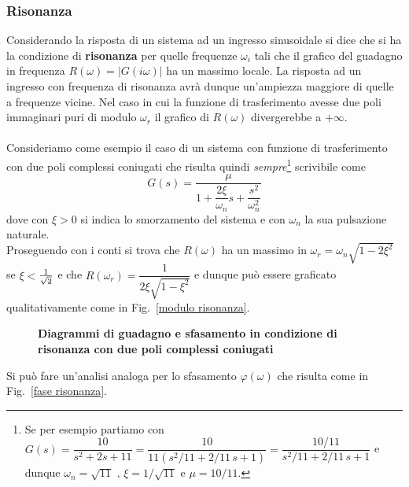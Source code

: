 \documentclass[a4paper]{article}
\begin{document}
	\subsubsection{Risonanza}
	Considerando la risposta di un sistema ad un ingresso sinusoidale si dice che si ha la condizione di \textbf{risonanza} per quelle frequenze $\omega_i$ tali che il grafico del guadagno in frequenza $R(\omega)=|G(i\omega)|$ ha un massimo locale. La risposta ad un ingresso con frequenza di risonanza avrà dunque un'ampiezza maggiore di quelle a frequenze vicine. Nel caso in cui la funzione di trasferimento avesse due poli immaginari puri di modulo $\omega_r$ il grafico di $R(\omega)$ divergerebbe a $+\infty$. 
	\\\\
	Consideriamo come esempio il caso di un sistema con funzione di trasferimento con due poli complessi coniugati che risulta quindi \emph{sempre}\footnote{Se per esempio partiamo con $G(s)=\dfrac{10}{s^2+2s+11}=\dfrac{10}{11(s^2/11+2/11\,s+1)}=\dfrac{10/11}{s^2/11+2/11\,s+1}$ e dunque $\omega_n=\sqrt{11}\,\,,\,\xi=1/\sqrt{11}$ e $\mu=10/11$.} scrivibile come 
	\[G(s)=\dfrac{\mu}{1+\dfrac{2\xi}{\omega_n}s+\dfrac{s^2}{\omega_n^2}}\] 
	dove con $\xi>0$ si indica lo smorzamento del sistema e con $\omega_n$ la sua pulsazione naturale.
	\\Proseguendo con i conti si trova che $R(\omega)$ ha un massimo in $\omega_r=\omega_n\sqrt{1-2\xi^2}$ se $\xi<$$ 1\over\sqrt{2}$ e che $R(\omega_r)=\dfrac{1}{2\xi\sqrt{1-\xi^2}}$ e dunque può essere graficato qualitativamente come in Fig.~\ref{modulo risonanza}.\\
	\begin{figure}[htbp]
		\centering
		\qquad %
		
		\caption{\textbf{Diagrammi di guadagno e sfasamento in condizione di risonanza con due poli complessi coniugati}}
	\end{figure}
	
	Si può fare un'analisi analoga per lo sfasamento $\varphi(\omega)$ che risulta come in Fig.~\ref{fase risonanza}.\\
	
\end{document}
